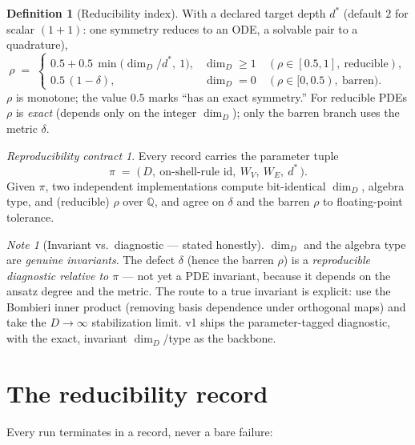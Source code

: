 \documentclass[11pt]{article}
\theoremstyle{definition}
\newtheorem{definition}{Definition}[section]
\theoremstyle{remark}
\newtheorem*{contract}{Reproducibility contract}
\newtheorem*{designnote}{Note}
\newcommand{\Q}{\mathbb{Q}}
\begin{document}
\begin{definition}[Reducibility index]
With a declared target depth $d^\ast$ (default $2$ for scalar $(1{+}1)$: one symmetry reduces to an
ODE, a solvable pair to a quadrature),
\[
\rho \;=\;
\begin{cases}
0.5+0.5\,\min\!\big(\dim_D/d^\ast,\ 1\big), & \dim_D\ge 1 \quad(\rho\in[0.5,1],\ \text{reducible}),\\[6pt]
0.5\,(1-\delta), & \dim_D=0 \quad(\rho\in[0,0.5),\ \text{barren}).
\end{cases}
\]
$\rho$ is monotone; the value $0.5$ marks ``has an exact symmetry.'' For reducible PDEs $\rho$ is
\emph{exact} (depends only on the integer $\dim_D$); only the barren branch uses the metric
$\delta$.
\end{definition}

\begin{contract}
Every record carries the parameter tuple
\[
\pi \;=\; \big(\,D,\ \text{on-shell-rule id},\ W_V,\ W_E,\ d^\ast\,\big).
\]
Given $\pi$, two independent implementations compute bit-identical $\dim_D$, algebra type, and
(reducible) $\rho$ over $\Q$, and agree on $\delta$ and the barren $\rho$ to floating-point
tolerance.
\end{contract}

\begin{designnote}[Invariant vs.\ diagnostic --- stated honestly]
$\dim_D$ and the algebra type are \emph{genuine invariants}. The defect $\delta$ (hence the barren
$\rho$) is a \emph{reproducible diagnostic relative to $\pi$} --- not yet a PDE invariant, because it
depends on the ansatz degree and the metric. The route to a true invariant is explicit: use the
Bombieri inner product (removing basis dependence under orthogonal maps) and take the $D\to\infty$
stabilization limit. v1 ships the parameter-tagged diagnostic, with the exact, invariant
$\dim_D$/type as the backbone.
\end{designnote}

\section{The reducibility record}

Every run terminates in a record, never a bare failure:
\end{document}
